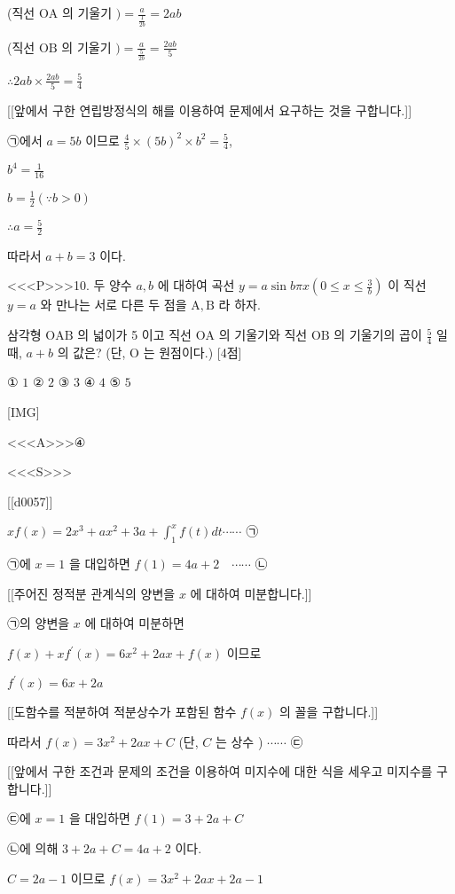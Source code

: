 \documentclass{oblivoir}
\begin{document}
(직선 $\mathrm{OA}$ 의 기울기 $)=\frac{a}{\frac{1}{2 b}}=2 a b$

(직선 $\mathrm{OB}$ 의 기울기 $)=\frac{a}{\frac{5}{2 b}}=\frac{2 a b}{5}$

$\therefore 2 a b \times \frac{2 a b}{5}=\frac{5}{4}$

[[앞에서 구한 연립방정식의 해를 이용하여 문제에서 요구하는 것을 구합니다.]]

㉠에서 $a=5 b$ 이므로 $\frac{4}{5} \times(5 b)^{2} \times b^{2}=\frac{5}{4}$,

$b^{4}=\frac{1}{16}$

$b=\frac{1}{2}(\because b>0)$

$\therefore a=\frac{5}{2}$

따라서 $a+b=3$ 이다.


<<<P>>>10. 두 양수 $a, b$ 에 대하여 곡선 $y=a \sin b \pi x\left(0 \leq x \leq \frac{3}{b}\right)$ 이 직선 $y=a$ 와 만나는 서로 다른 두 점을 $\mathrm{A}, \mathrm{B}$ 라 하자.

삼각형 $\mathrm{OAB}$ 의 넓이가 5 이고 직선 $\mathrm{OA}$ 의 기울기와 직선 $\mathrm{OB}$ 의 기울기의 곱이 $\frac{5}{4}$ 일 때, $a+b$ 의 값은? (단, $\mathrm{O}$ 는 원점이다.) [4점]

① $1$
② $2$
③ $3$
④ $4$
⑤ $5$

[IMG]

<<<A>>>④

<<<S>>>

[[d0057]]

$x f(x)=2 x^{3}+a x^{2}+3 a+\int_{1}^{x} f(t) d t \cdots \cdots$ ㉠

㉠에 $x=1$ 을 대입하면 $f(1)=4 a+2 \quad \cdots \cdots$ ㉡

[[주어진 정적분 관계식의 양변을 $x$ 에 대하여 미분합니다.]]

㉠의 양변을 $x$ 에 대하여 미분하면

$f(x)+x f^{\prime}(x)=6 x^{2}+2 a x+f(x) $ 이므로

$f^{\prime}(x)=6 x+2 a$

[[도함수를 적분하여 적분상수가 포함된 함수 $f(x)$ 의 꼴을 구합니다.]]

따라서 $f(x)=3 x^{2}+2 a x+C$ (단, $C$ 는 상수 ) $\cdots \cdots$  ㉢

[[앞에서 구한 조건과 문제의 조건을 이용하여 미지수에 대한 식을 세우고 미지수를 구합니다.]]

㉢에 $x=1$ 을 대입하면 $f(1)=3+2 a+C$

㉡에 의해 $3+2 a+C=4 a+2$ 이다.

$C=2 a-1 $ 이므로 $f(x)=3 x^{2}+2 a x+2 a-1$
\end{document}
